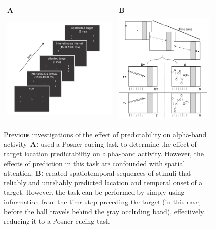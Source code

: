 \documentclass[12pt]{article}
\begin{document}
\begin{figure}[h!]
\begin{tabular}{ll}
\textbf{A} & \textbf{B} \\
\includegraphics[width=3.5in]{BuschVanRullen10.png} &
\includegraphics[width=3in]{DohertyRaoMesulamEtAl05.png} \\
\end{tabular}
\caption{\small{Previous investigations of the effect of predictability on alpha-band activity. \textbf{A:} \protect{} used a Posner cueing task to determine the effect of target location predictability on alpha-band activity. However, the effects of prediction in this task are confounded with spatial attention. \textbf{B:} \protect{} created spatiotemporal sequences of stimuli that reliably and unreliably predicted location and temporal onset of a target. However, the task can be performed by simply using information from the time step preceding the target (in this case, before the ball travels behind the gray occluding band), effectively reducing it to a Posner cueing task.}
\label{fig:previous_expts}}
\end{figure}
\end{document}
